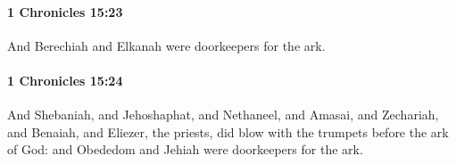		\paragraph{1 Chronicles 15:23} %
			\label{1CHRONICLES-15-23}

			And Berechiah and Elkanah were doorkeepers for the ark.


		\paragraph{1 Chronicles 15:24} %
			\label{1CHRONICLES-15-24}

			And Shebaniah, and Jehoshaphat, and Nethaneel, and Amasai, and Zechariah, and Benaiah, and Eliezer, the priests, did blow with the trumpets before the ark of God: and Obededom and Jehiah were doorkeepers for the ark.


